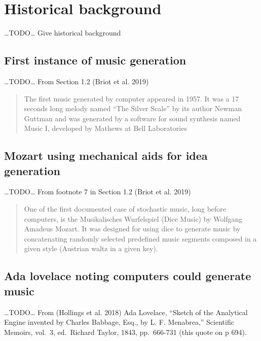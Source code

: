 \documentclass[12pt,a4paper,]{report}
\begin{document}
\hypertarget{historical-background}{%
\section{Historical background}\label{historical-background}}

\ldots TODO\ldots{} Give historical background

\hypertarget{first-instance-of-music-generation}{%
\subsection{First instance of music
generation}\label{first-instance-of-music-generation}}

\ldots TODO\ldots{} From Section 1.2 (Briot et al. 2019)

\begin{quote}
The first music generated by computer appeared in 1957. It was a 17
seconds long melody named ``The Silver Scale'' by its author Newman
Guttman and was generated by a software for sound synthesis named Music
I, developed by Mathews at Bell Laboratories
\end{quote}

\hypertarget{mozart-using-mechanical-aids-for-idea-generation}{%
\subsection{Mozart using mechanical aids for idea
generation}\label{mozart-using-mechanical-aids-for-idea-generation}}

\ldots TODO\ldots{} From footnote 7 in Section 1.2 (Briot et al. 2019)

\begin{quote}
One of the first documented case of stochastic music, long before
computers, is the Musikalisches Wurfelspiel (Dice Music) by Wolfgang
Amadeus Mozart. It was designed for using dice to generate music by
concatenating randomly selected predefined music segments composed in a
given style (Austrian waltz in a given key).
\end{quote}

\hypertarget{ada-lovelace-noting-computers-could-generate-music}{%
\subsection{Ada lovelace noting computers could generate
music}\label{ada-lovelace-noting-computers-could-generate-music}}

\ldots TODO\ldots{} From (Hollings et al. 2018) Ada Lovelace, ``Sketch
of the Analytical Engine invented by Charles Babbage, Esq., by L. F.
Menabrea,'' Scientific Memoirs, vol.~3, ed.~Richard Taylor, 1843,
pp.~666-731 (this quote on p 694).
\end{document}
